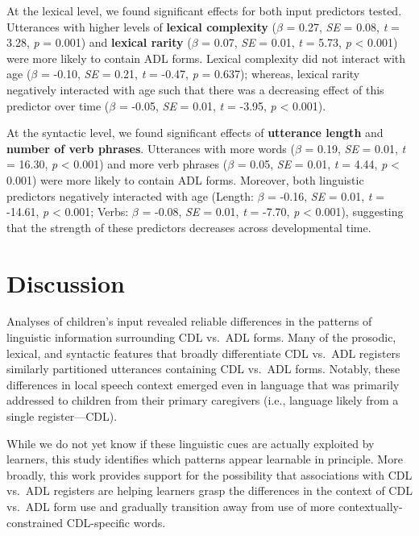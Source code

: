 \documentclass[10pt, letterpaper]{article}
\begin{document}
At the lexical level, we found significant effects for both input
predictors tested. Utterances with higher levels of \textbf{lexical
complexity} (\(\beta\) = 0.27, \emph{SE} = 0.08, \emph{t} = 3.28,
\emph{p} = 0.001) and \textbf{lexical rarity} (\(\beta\) = 0.07,
\emph{SE} = 0.01, \emph{t} = 5.73, \emph{p} \textless{} 0.001) were more
likely to contain ADL forms. Lexical complexity did not interact with
age (\(\beta\) = -0.10, \emph{SE} = 0.21, \emph{t} = -0.47, \emph{p} =
0.637); whereas, lexical rarity negatively interacted with age such that
there was a decreasing effect of this predictor over time (\(\beta\) =
-0.05, \emph{SE} = 0.01, \emph{t} = -3.95, \emph{p} \textless{} 0.001).

At the syntactic level, we found significant effects of
\textbf{utterance length} and \textbf{number of verb phrases}.
Utterances with more words (\(\beta\) = 0.19, \emph{SE} = 0.01, \emph{t}
= 16.30, \emph{p} \textless{} 0.001) and more verb phrases (\(\beta\) =
0.05, \emph{SE} = 0.01, \emph{t} = 4.44, \emph{p} \textless{} 0.001)
were more likely to contain ADL forms. Moreover, both linguistic
predictors negatively interacted with age (Length: \(\beta\) = -0.16,
\emph{SE} = 0.01, \emph{t} = -14.61, \emph{p} \textless{} 0.001; Verbs:
\(\beta\) = -0.08, \emph{SE} = 0.01, \emph{t} = -7.70, \emph{p}
\textless{} 0.001), suggesting that the strength of these predictors
decreases across developmental time.

\hypertarget{discussion-1}{%
\section{Discussion}\label{discussion-1}}

Analyses of children's input revealed reliable differences in the
patterns of linguistic information surrounding CDL vs.~ADL forms. Many
of the prosodic, lexical, and syntactic features that broadly
differentiate CDL vs.~ADL registers similarly partitioned utterances
containing CDL vs.~ADL forms. Notably, these differences in local speech
context emerged even in language that was primarily addressed to
children from their primary caregivers (i.e., language likely from a
single register---CDL).

While we do not yet know if these linguistic cues are actually exploited
by learners, this study identifies which patterns appear learnable in
principle. More broadly, this work provides support for the possibility
that associations with CDL vs.~ADL registers are helping learners grasp
the differences in the context of CDL vs.~ADL form use and gradually
transition away from use of more contextually-constrained CDL-specific
words.
\end{document}

